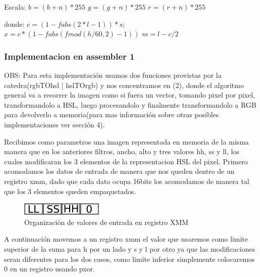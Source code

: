 \documentclass[a4paper]{article}
\begin{document}
\begin{enumerate}
		Escala:\newline
		$b = (b+n) * 255$\newline
		$g = (g+n) * 255$\newline
		$r = (r+n) * 255$\newline

		donde:\newline
		$c = ( 1 - fabs( 2*l - 1 )) * s;$\newline
		$x = c * ( 1 - fabs( fmod( h/60, 2 ) - 1 ) )$\newline
		$m = l - c / 2$\newline


\end{enumerate}

\subsubsection{Implementacion en assembler 1}
OBS: Para esta implementación usamos dos funciones provistas por la catedra(rgbTOhsl | hslTOrgb) y nos concentramos en (2), donde el algoritmo general va a recorrer la imagen como si fuera un vector, tomando pixel por pixel, transformandolo a HSL, luego procesandolo y finalmente transformandolo a RGB para devolverlo a memoria(para mas información sobre otras posibles implementaciones ver sección 4).



Recibimos como parametros una imagen representada en memoria de la misma manera que en los anteriores filtros, ancho, alto y tres valores hh, ss y ll, los cuales modificaran los 3 elementos de la representacion HSL del pixel.
Primero acomodamos los datos de entrada de manera que nos queden dentro de un registro xmm, dado que cada dato ocupa 16bits los acomodamos de manera tal que los 3 elementos queden empaquetados.

\begin{figure}[H]
\centering
\includegraphics[scale=0.8]{imagenes/llsshh.png}
\caption{Organización de valores de entrada en registro XMM}
\label{lshValue6}
\end{figure}

A continuación movemos a un registro xmm el valor que usaremos como limite superior de la suma para h por un lado y s y l por otro ya que las modificaciones seran diferentes para los dos casos, como limite inferior simplemente colocaremos 0 en un registro usando pxor.
\end{document}
